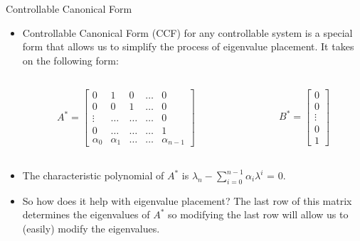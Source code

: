 \documentclass{beamer}
\begin{document}
\begin{frame}{Controllable Canonical Form}
\begin{itemize}
\item Controllable Canonical Form (CCF) for any controllable system is a special form that allows us to simplify the process of eigenvalue placement. It takes on the following form:
\begin{columns}

\begin{column}{0.25\textwidth}
\begin{align*}
A^* = 
\begin{bmatrix}
0&1&0 &\hdots &0\\
0& 0 & 1& \hdots&0\\
\vdots&  \hdots &  \hdots& \hdots&0\\
0 & \hdots &\hdots & \hdots &1\\
\alpha_{0} & \alpha_{1}& \hdots & \hdots & \alpha_{n-1}
\end{bmatrix}
\end{align*}
\end{column}
\begin{column}{0.25\textwidth}
\begin{align*}
B^* = 
\begin{bmatrix}
0\\
0\\
\vdots\\
0\\
1
\end{bmatrix}
\end{align*}
\end{column}
\end{columns}\pause
\item The characteristic polynomial of $A^*$ is $\lambda_n - \sum\limits_{i = 0}^{n-1} \alpha_i\lambda^i$ = 0.
\item So how does it help with eigenvalue placement? \pause The last row of this matrix determines the eigenvalues of $A^*$ so modifying the last row will allow us to (easily) modify the eigenvalues.  
\end{itemize}
\end{frame}
\end{document}
